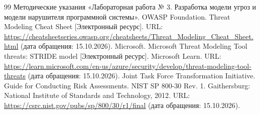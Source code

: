 \documentclass[12pt,a4paper]{article}
\begin{document}
\clearpage
\renewcommand{\refname}{Список использованных источников}
\begin{thebibliography}{99}
 Методические указания «Лабораторная работа № 3. Разработка модели угроз и модели нарушителя программной системы».
 \mbox{OWASP} Foundation. Threat Modeling Cheat Sheet [Электронный ресурс]. URL: \url{https://cheatsheetseries.owasp.org/cheatsheets/Threat_Modeling_Cheat_Sheet.html} (дата обращения: 15.10.2026).
 Microsoft. Microsoft Threat Modeling Tool threats: STRIDE model [Электронный ресурс]. Microsoft Learn. URL: \url{https://learn.microsoft.com/en-us/azure/security/develop/threat-modeling-tool-threats} (дата обращения: 15.10.2026).
 Joint Task Force Transformation Initiative. Guide for Conducting Risk Assessments. NIST SP 800-30 Rev. 1. Gaithersburg: National Institute of Standards and Technology, 2012. URL: \url{https://csrc.nist.gov/pubs/sp/800/30/r1/final} (дата обращения: 15.10.2026).
\end{thebibliography}
\end{document}
